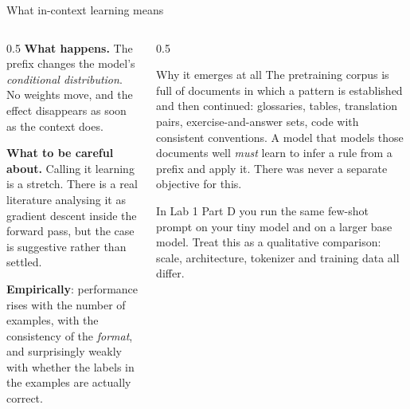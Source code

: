 \documentclass[aspectratio=169,10pt]{beamer}
\begin{document}
\begin{frame}{What in-context learning means}
  \begin{columns}[T]
    \begin{column}{0.5\textwidth}
      \textbf{What happens.} The prefix changes the model's \emph{conditional
      distribution}. No weights move, and the effect disappears as soon as the
      context does.
      \vspace{0.5em}

      \textbf{What to be careful about.} Calling it learning is a stretch.
      There is a real literature analysing it as gradient descent inside the
      forward pass, but the case is suggestive rather than settled.
      \vspace{0.5em}

      \textbf{Empirically}: performance rises with the number of examples, with
      the consistency of the \emph{format}, and surprisingly weakly with whether
      the labels in the examples are actually correct.
    \end{column}
    \begin{column}{0.5\textwidth}
      \begin{block}{Why it emerges at all}
        \small
        The pretraining corpus is full of documents in which a pattern is
        established and then continued: glossaries, tables, translation pairs,
        exercise-and-answer sets, code with consistent conventions.
        \vspace{0.4em}
        A model that models those documents well \emph{must} learn to infer a
        rule from a prefix and apply it. There was never a separate objective
        for this.
      \end{block}
      \vspace{0.3em}
      \small
      In Lab 1 Part D you run the same few-shot prompt on your tiny model and on
      a larger base model. Treat this as a qualitative comparison: scale,
      architecture, tokenizer and training data all differ.
    \end{column}
  \end{columns}
\end{frame}
\end{document}
